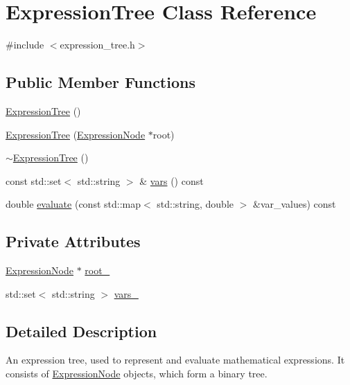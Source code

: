 \hypertarget{classExpressionTree}{}\section{Expression\+Tree Class Reference}
\label{classExpressionTree}


{\ttfamily \#include $<$expression\+\_\+tree.\+h$>$}

\subsection*{Public Member Functions}
\begin{DoxyCompactItemize}
\item 
\hyperlink{classExpressionTree_a0d743ee804cf5d9c792906f936151886}{Expression\+Tree} ()
\item 
\hyperlink{classExpressionTree_a1f440e320b521da0b79962e46576e445}{Expression\+Tree} (\hyperlink{classExpressionNode}{Expression\+Node} $\ast$root)
\item 
\hyperlink{classExpressionTree_a7c172d77927af5a57fded65b1777fc17}{$\sim$\+Expression\+Tree} ()
\item 
const std\+::set$<$ std\+::string $>$ \& \hyperlink{classExpressionTree_aa0b1bf8079883e70cc7afa246223937c}{vars} () const 
\item 
double \hyperlink{classExpressionTree_a1e1800ce2b16f56e77f7970f8b7319eb}{evaluate} (const std\+::map$<$ std\+::string, double $>$ \&var\+\_\+values) const 
\end{DoxyCompactItemize}
\subsection*{Private Attributes}
\begin{DoxyCompactItemize}
\item 
\hyperlink{classExpressionNode}{Expression\+Node} $\ast$ \hyperlink{classExpressionTree_a35b30d1e1b457452ffc581da4b781f78}{root\+\_\+}
\item 
std\+::set$<$ std\+::string $>$ \hyperlink{classExpressionTree_aa396f95ec3ecb764d9d0b0598c749964}{vars\+\_\+}
\end{DoxyCompactItemize}


\subsection{Detailed Description}
An expression tree, used to represent and evaluate mathematical expressions. It consists of \hyperlink{classExpressionNode}{Expression\+Node} objects, which form a binary tree. 

